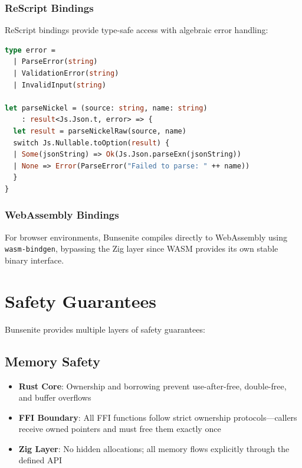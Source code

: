 \documentclass[11pt,a4paper]{article}
\begin{document}
\subsubsection{ReScript Bindings}

ReScript bindings provide type-safe access with algebraic error handling:

\begin{lstlisting}[language=ML,caption={ReScript binding with Result type}]
type error =
  | ParseError(string)
  | ValidationError(string)
  | InvalidInput(string)

let parseNickel = (source: string, name: string)
    : result<Js.Json.t, error> => {
  let result = parseNickelRaw(source, name)
  switch Js.Nullable.toOption(result) {
  | Some(jsonString) => Ok(Js.Json.parseExn(jsonString))
  | None => Error(ParseError("Failed to parse: " ++ name))
  }
}
\end{lstlisting}

\subsubsection{WebAssembly Bindings}

For browser environments, Bunsenite compiles directly to WebAssembly using \texttt{wasm-bindgen}, bypassing the Zig layer since WASM provides its own stable binary interface.

\section{Safety Guarantees}

Bunsenite provides multiple layers of safety guarantees:

\subsection{Memory Safety}

\begin{itemize}
    \item \textbf{Rust Core}: Ownership and borrowing prevent use-after-free, double-free, and buffer overflows
    \item \textbf{FFI Boundary}: All FFI functions follow strict ownership protocols---callers receive owned pointers and must free them exactly once
    \item \textbf{Zig Layer}: No hidden allocations; all memory flows explicitly through the defined API
\end{itemize}
\end{document}
